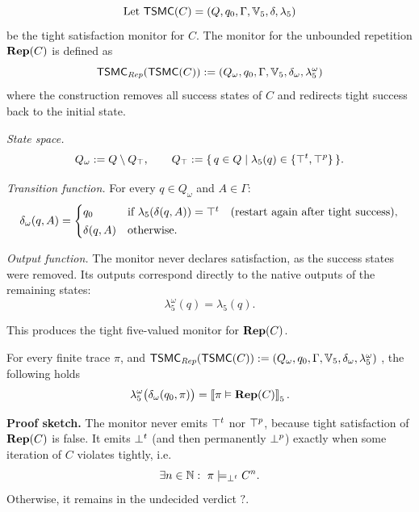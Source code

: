 \begin{definition}
\label{def:moore-repeat-unbounded}
\[\text{Let }
\mathsf{TSMC}(C)=(Q,q_0,\Gamma,\mathbb{V}_5 ,\delta,\lambda_5)
\]
be the tight satisfaction monitor for $C$.
The monitor for the unbounded repetition $\mathbf{Rep}(C)$ is defined as
\[
\mathsf{TSMC}_{\mathit{Rep}}(\mathsf{TSMC}(C))
  := (Q_\omega,q_0,\Gamma,\mathbb{V}_5 ,\delta_\omega,\lambda_5^{\omega})
\]
where the construction removes all success states of $C$ and redirects
tight success back to the initial state.

\medskip
\noindent\emph{State space.}
\[
Q_\omega := Q \setminus Q_{\top},
\qquad
Q_{\top} := \{\, q\in Q \mid \lambda_5(q)\in\{\top^t,\top^p\}\,\}.
\]

\medskip
\noindent\emph{Transition function.}
For every $q\in Q_\omega$ and $A\in\Gamma$:
\[
\delta_\omega(q,A)=
\begin{cases}
q_0
  & \text{if }\lambda_5(\delta(q,A))=\top^t 
    \quad(\text{restart again after tight success}),\\[2pt]
\delta(q,A)
  & \text{otherwise}.
\end{cases}
\]

\medskip
\noindent\emph{Output function.}
The monitor never declares satisfaction, as the success states were removed. Its outputs correspond directly to the native outputs of the remaining states:
\[
\lambda_5^{\omega}(q) = \lambda_5(q).
\]

This produces the tight five-valued monitor for $\mathbf{Rep}(C)$.
\end{definition}

\begin{lemma}
\label{lem:repeat-unbounded-correct}
For every finite trace $\pi$, and
$\mathsf{TSMC}_{\mathit{Rep}}(\mathsf{TSMC}(C))
  := (Q_\omega,q_0,\Gamma,\mathbb{V}_5 ,\delta_\omega,\lambda_5^{\omega})$
, the following holds
\[
\lambda_5^{\omega}\bigl(\delta_\omega(q_0,\pi)\bigr)
  = \left\llbracket \pi \vDash \mathbf{Rep}(C) \right\rrbracket_{5}.
\]
\end{lemma}
\textbf{Proof sketch.}
The monitor never emits $\top^t$ nor $\top^p$, because tight satisfaction of
$\mathbf{Rep}(C)$ is false.  
It emits $\bot^t$ (and then permanently $\bot^p$) exactly when some iteration of
$C$ violates tightly, i.e.
\[
\exists n\in\mathbb{N}:\ \pi \models_{\bot^t} C^n.
\]
Otherwise, it remains in the undecided verdict $\mathsf{?}$.



